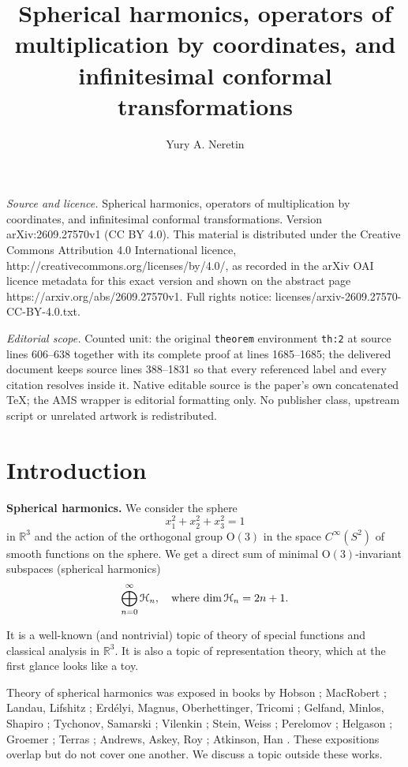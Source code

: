 \documentclass[10pt,a4paper]{amsart}
\newcounter{sec}
\newcounter{punct}[sec]
\def\punct{\refstepcounter{punct}{\arabic{sec}.\arabic{punct}.  }}
\def\COUNTERS{\addtocounter{sec}{1}
              \setcounter{punct}{0}
          \setcounter{equation}{0}
          \setcounter{theorem}{0}
          }
\renewcommand\O{\mathrm{O}}
\def\cH{\EuScript H}
\def\R {{\mathbb R }}
\begin{document}
\title[Spherical harmonics, operators of multiplication by coordina]{Spherical harmonics, operators of multiplication by coordinates, and infinitesimal conformal transformations}
\author{Yury A. Neretin}
\date{}
\maketitle
\noindent\emph{Source and licence.} Spherical harmonics, operators of multiplication by coordinates, and infinitesimal conformal transformations. Version arXiv:2609.27570v1 (CC BY 4.0). This material is distributed under the Creative Commons Attribution 4.0 International licence, http://creativecommons.org/licenses/by/4.0/, as recorded in the arXiv OAI licence metadata for this exact version and shown on the abstract page https://arxiv.org/abs/2609.27570v1. Full rights notice: licenses/arxiv-2609.27570-CC-BY-4.0.txt.\par\smallskip
\noindent\textit{Editorial scope.} Counted unit: the original \texttt{theorem} environment \texttt{th:2} at source lines 606--638 together with its complete proof at lines 1685--1685; the delivered document keeps source lines 388--1831 so that every referenced label and every citation resolves inside it. Native editable source is the paper's own concatenated TeX; the AMS wrapper is editorial formatting only. No publisher class, upstream script or unrelated artwork is redistributed.
\section{Introduction}

\COUNTERS

{\bf \punct Spherical harmonics.}
We consider the sphere 
$$
x_1^2+x_2^2+x_3^2=1
$$
in $\R^3$ and the action of the  orthogonal
group $\O(3)$ in the space $C^\infty(S^2)$ of
smooth functions on the sphere.  
We get a direct sum of  
 minimal $\O(3)$-invariant subspaces
 (spherical harmonics) 
$$
\bigoplus_{n=0}^\infty \cH_n,\quad  
\text{where $\dim \cH_n={2n+1}$.}
$$

 It is a well-known (and nontrivial) topic of   theory of special functions and classical analysis in $\R^3$. It is also a topic
of representation theory, which at the first glance looks like a toy.

 
Theory of spherical harmonics was exposed in books by Hobson \cite{Hob};
MacRobert \cite{Mac};
Landau, Lifshitz \cite{LL};
Erd\'elyi, Magnus, Oberhettinger, Tricomi \cite{HTF2};
Gelfand, Minlos, Shapiro \cite{GMS}; %
Tychonov,  Samarski \cite{TS}; %
Vilenkin \cite{Vil};
Stein, Weiss \cite{SW}; %
Perelomov \cite{Per}; %
Helgason \cite{Hel}; %
Groemer \cite{Gro};
Terras \cite{Ter}; %
Andrews, Askey, Roy \cite{AAR};
Atkinson, Han \cite{AH}. %
These expositions overlap but do not cover one another.
We discuss a topic outside these works.
\end{document}
